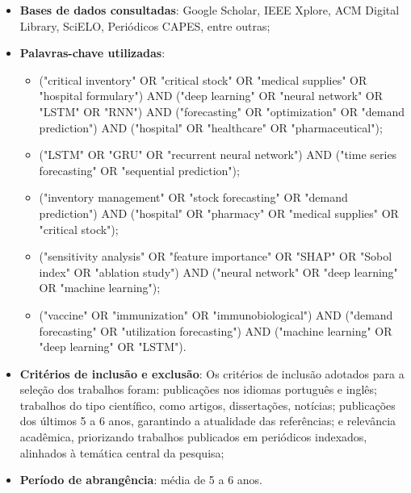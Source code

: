 \documentclass[
    12pt,
    openright,
    oneside,
    a4paper,
    english,
    brazil
]{abntex2}
\begin{document}
\begin{itemize}
    \item \textbf{Bases de dados consultadas}: Google Scholar, IEEE Xplore, ACM Digital Library, SciELO, Periódicos CAPES, entre outras;
    \item \textbf{Palavras-chave utilizadas}:
    \begin{itemize}
        \item ("critical inventory" OR "critical stock" OR "medical supplies" OR "hospital formulary") AND ("deep learning" OR "neural network" OR "LSTM" OR "RNN") AND ("forecasting" OR "optimization" OR "demand prediction") AND ("hospital" OR "healthcare" OR "pharmaceutical");
        \item ("LSTM" OR "GRU" OR "recurrent neural network") AND ("time series forecasting" OR "sequential prediction");
        \item ("inventory management" OR "stock forecasting" OR "demand prediction") AND ("hospital" OR "pharmacy" OR "medical supplies" OR "critical stock");
        \item ("sensitivity analysis" OR "feature importance" OR "SHAP" OR "Sobol index" OR "ablation study") AND ("neural network" OR "deep learning" OR "machine learning");
        \item ("vaccine" OR "immunization" OR "immunobiological") AND ("demand forecasting" OR "utilization forecasting") AND ("machine learning" OR "deep learning" OR "LSTM").
    \end{itemize}
    \item \textbf{Critérios de inclusão e exclusão}: Os critérios de inclusão adotados para a seleção dos trabalhos foram: publicações nos idiomas português e inglês; trabalhos do tipo científico, como artigos, dissertações, notícias; publicações dos últimos 5 a 6 anos, garantindo a atualidade das referências; e relevância acadêmica, priorizando trabalhos publicados em periódicos indexados, alinhados à temática central da pesquisa;
    \item \textbf{Período de abrangência}: média de 5 a 6 anos.
\end{itemize}
\end{document}
